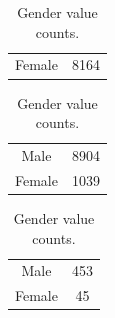 \begin{table}[!h]
    \caption{Gender value counts.}
    \label{tab:gender}

    \begin{subtable}[ht]{.5\textwidth}
        \centering
        \begin{tabular}{cc}
            Female & 8164 \\
        \end{tabular}
    \end{subtable}
    \begin{subtable}[ht]{.5\textwidth}
        \centering
        \begin{tabular}{cc}
            Male & 8904 \\
            Female & 1039 \\
        \end{tabular}
    \end{subtable}

    \vspace{5mm}

    \begin{subtable}[ht]{.5\textwidth}
        \centering
        \begin{tabular}{cc}
            Male & 453 \\
            Female & 45 \\
        \end{tabular}
    \end{subtable}
\end{table}



